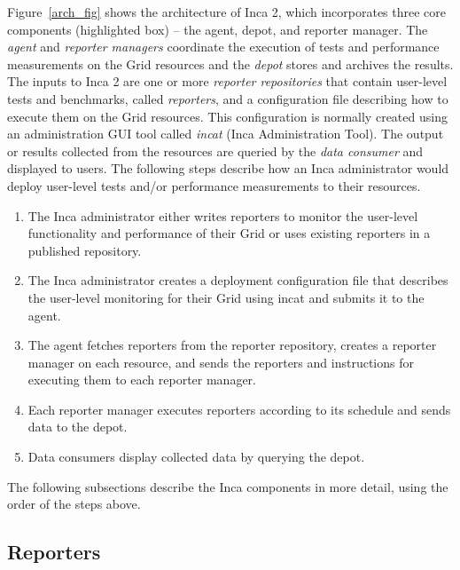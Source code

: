 \documentclass{sig-alternate}
\begin{document}
Figure~\ref{arch_fig} shows the architecture of Inca 2, which
incorporates three core
components (highlighted box) -- the agent, depot, and reporter manager.
The \textit{agent} and \textit{reporter managers} coordinate the execution of
tests and performance measurements on the Grid resources and the
\textit{depot} stores and archives the results.  The inputs to Inca 2 are one
or more \textit{reporter repositories} that contain user-level tests and
benchmarks, called \textit{reporters}, and a configuration file describing how
to execute them on the Grid resources.  This configuration is normally created
using an administration GUI tool
called \textit{incat} (Inca Administration Tool).  The output or results
collected from the resources are queried by the \textit{data consumer} and
displayed to users.  The following steps describe how an Inca administrator
would deploy user-level tests and/or performance measurements to their
resources.

\begin{enumerate}

\item The Inca
administrator either writes reporters to monitor the user-level functionality
and performance of their Grid or uses existing
reporters in a published repository.

\item The Inca administrator creates a deployment configuration file that
describes the user-level monitoring for their Grid using incat and submits it
to the agent.

\item The agent fetches reporters from the reporter repository, creates a
reporter manager on each resource, and sends the reporters and instructions for
executing them to each reporter manager.

\item Each reporter manager executes reporters according to its schedule and
sends data to the depot.

\item Data consumers display collected data by querying the depot.
\end{enumerate}

\noindent The following subsections describe the Inca components in more
detail, using the order of the steps above.

\subsection{Reporters}
\end{document}
